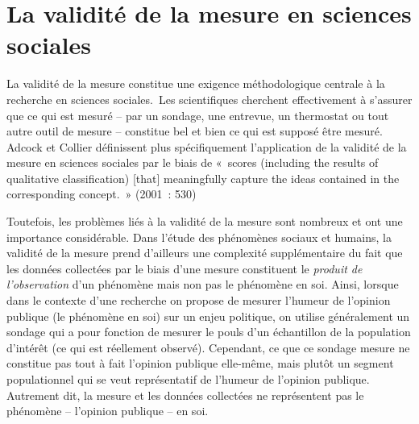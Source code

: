 \documentclass[
  letterpaper,
]{scrbook}
\begin{document}
\hypertarget{la-validituxe9-de-la-mesure-en-sciences-sociales}{%
\section{La validité de la mesure en sciences
sociales}\label{la-validituxe9-de-la-mesure-en-sciences-sociales}}

La validité de la mesure constitue une exigence méthodologique centrale
à la recherche en sciences sociales.~Les scientifiques cherchent
effectivement à s'assurer que ce qui est mesuré -- par un sondage, une
entrevue, un thermostat ou tout autre outil de mesure -- constitue bel
et bien ce qui est supposé être mesuré. Adcock et Collier définissent
plus spécifiquement l'application de la validité de la mesure en
sciences sociales par le biais de «~scores (including the results of
qualitative classification) {[}that{]} meaningfully capture the ideas
contained in the corresponding concept.~» (2001~: 530)

Toutefois, les problèmes liés à la validité de la mesure sont nombreux
et ont une importance considérable. Dans l'étude des phénomènes sociaux
et humains, la validité de la mesure prend d'ailleurs une complexité
supplémentaire du fait que les données collectées par le biais d'une
mesure constituent le \emph{produit de l'observation} d'un phénomène
mais non pas le phénomène en soi. Ainsi, lorsque dans le contexte d'une
recherche on propose de mesurer l'humeur de l'opinion publique (le
phénomène en soi) sur un enjeu politique, on utilise généralement un
sondage qui a pour fonction de mesurer le pouls d'un échantillon de la
population d'intérêt (ce qui est réellement observé). Cependant, ce que
ce sondage mesure ne constitue pas tout à fait l'opinion publique
elle-même, mais plutôt un segment populationnel qui se veut
représentatif de l'humeur de l'opinion publique. Autrement dit, la
mesure et les données collectées ne représentent pas le phénomène --
l'opinion publique -- en soi.
\end{document}
